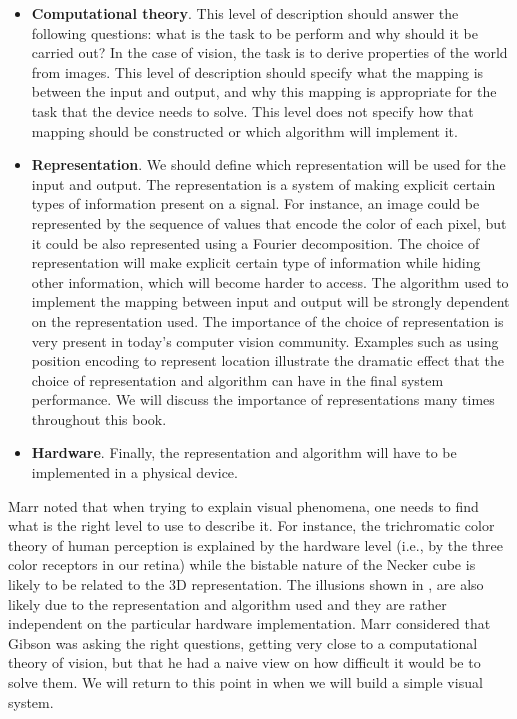 \begin{itemize}
\item {\bf Computational theory}. This level of description should answer the following questions: what is the task to be perform and why should it be carried out? In the case of vision, the task is to derive properties of the world from images. This level of description should specify what the mapping is between the input and output, and why this mapping is appropriate for the task that the device needs to solve. This level does not specify how that mapping should be constructed or which algorithm will implement it.  
\item {\bf Representation}. We should define which representation will be used for the input and output. The representation is a system of making explicit certain types of information present on a signal. For instance, an image could be represented by the sequence of values that encode the color of each pixel, but it could be also represented using a Fourier decomposition. The choice of representation will make explicit certain type of information while hiding other information, which will become harder to access. The algorithm used to implement the mapping between input and output will be strongly dependent on the representation used. The importance of the choice of representation is very present in today’s computer vision community. Examples such as using position encoding to represent location illustrate the dramatic effect that the choice of representation and algorithm can have in the final system performance. We will discuss the importance of representations many times throughout this book.
\item {\bf Hardware}. Finally, the representation and algorithm will have to be implemented in a physical device.
\end{itemize}

Marr noted that when trying to explain visual phenomena, one needs to find what is the right level to use to describe it. For instance, the trichromatic color theory of human perception is explained by the hardware level (i.e., by the three color receptors in our retina) while the bistable nature of the Necker cube is likely to be related to the 3D representation. The illusions shown in \fig{\ref{fig:measuringScene}}, are also likely due to the representation and algorithm used and they are rather independent on the particular hardware implementation. Marr considered that Gibson was asking the right questions, getting very close to a computational theory of vision, but that he had a naive view on how difficult it would be to solve them. We will return to this point in \chap{\ref{chapter:simplesystem}} when we will build a simple visual system. 


